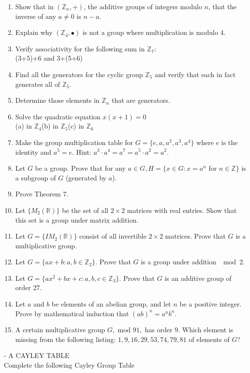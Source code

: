 \documentclass[12pt]{book}
\theoremstyle{definition}
\def\Z{\mathbb{Z}}
\begin{document}
\begin{enumerate}
\item Show that in $(\Z_n,+)$, the additive groups of integers modulo $n$, that the inverse of any $a\neq0$ is $n-a$.
\item Explain why $(\Z_4,\bullet)$ is not a group where multiplication is modulo 4.
\item Verify associativity for the following sum in $\Z_7$:\\
(3+5)+6 and 3+(5+6)
\item Find all the generators for the cyclic group $\Z_5$ and verify that each in fact generates all of $\Z_5$.
\item Determine those elements in $\Z_n$ that are generators.
\item Solve the quadratic equation $x(x+1)=0$\\
(a) in $\Z_4$\qquad (b) in $\Z_5$\qquad (c) in $\Z_6$
\item Make the group multiplication table for $G=\{e,a, a^2,a^3,a^4\}$ where $e$ is the identity and $a^5=e$.  Hint: $a^3\cdot a^4=a^7=a^5\cdot a^2 = a^2$.
\item Let $G$ be a group.  Prove that for any $a\in G, H=\{x\in G: x=a^n \text{ for }n\in \Z\}$ is a subgroup of $G$ (generated by $a$).
\item  Prove Theorem 7.
\item Let $ \{M_2(\mathbb{R})\} $ be the set of all $ 2\times 2 $ matrices with real entries. Show that this set is a group under matrix addition.
\item Let $ G=\{IM_2(\mathbb{R})\} $ consist of all invertible $ 2\times 2 $ matrices. Prove that $ G $ is a multiplicative group.
\item Let $ G=\{ax+b:a,b\in \Z_2 \} $. Prove that $ G $ is a group under addition $ \mod 2 $.
\item Let $ G=\{ax^2+bx+c:a,b,c\in \Z_3 \}. $ Prove that $ G $ is an additive group of order 27.
\item Let $ a $ and $ b $ be elements of an abelian group, and let $ n $ be a positive integer. Prove by mathematical induction that $ (ab)^n=a^nb^n $. 
\item A certain multiplicative group $ G, \text{ mod } 91, $ has order 9. Which element is missing from the following listing: $ 1, 9, 16, 29, 53, 74, 79, 81 $ of elements of $ G $?

\end{enumerate}
\clearpage

 - A CAYLEY TABLE\\[.2in]
Complete the following Cayley Group Table 
\end{document}

